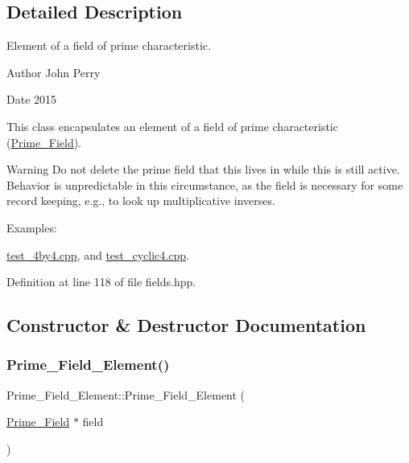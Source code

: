 \subsection{Detailed Description}
Element of a field of prime characteristic. 

\begin{DoxyAuthor}{Author}
John Perry 
\end{DoxyAuthor}
\begin{DoxyDate}{Date}
2015
\end{DoxyDate}
This class encapsulates an element of a field of prime characteristic (\hyperlink{class_prime___field}{Prime\+\_\+\+Field}).

\begin{DoxyWarning}{Warning}
Do not delete the prime field that {\ttfamily this} lives in while {\ttfamily this} is still active. Behavior is unpredictable in this circumstance, as the field is necessary for some record keeping, e.\+g., to look up multiplicative inverses. 
\end{DoxyWarning}
\begin{Desc}
\item[Examples\+: ]\par
\hyperlink{test_4by4_8cpp-example}{test\+\_\+4by4.\+cpp}, and \hyperlink{test_cyclic4_8cpp-example}{test\+\_\+cyclic4.\+cpp}.\end{Desc}


Definition at line 118 of file fields.\+hpp.



\subsection{Constructor \& Destructor Documentation}
\mbox{\label{class_prime___field___element_a52db0c88a43489efba10059b71d832ec}} 
\subsubsection{\texorpdfstring{Prime\+\_\+\+Field\+\_\+\+Element()}{Prime\_Field\_Element()}\hspace{0.1cm}{\footnotesize\ttfamily [1/2]}}
{\footnotesize\ttfamily Prime\+\_\+\+Field\+\_\+\+Element\+::\+Prime\+\_\+\+Field\+\_\+\+Element (\begin{DoxyParamCaption}\item[{\hyperlink{class_prime___field}{Prime\+\_\+\+Field} $\ast$}]{field }\end{DoxyParamCaption})}



